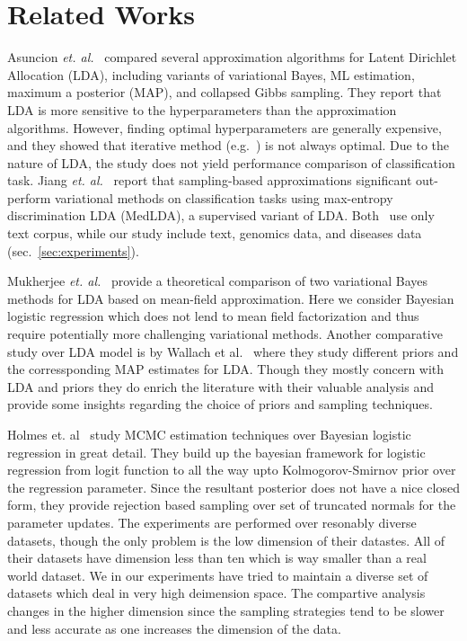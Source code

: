 \section{Related Works}

Asuncion {\it et. al.}~\cite{Asuncion2009smoothing} compared several
approximation algorithms for Latent Dirichlet Allocation (LDA), including
variants of variational Bayes, ML estimation, maximum a posterior (MAP), and
collapsed Gibbs sampling. They report that LDA is more sensitive to the
hyperparameters than the approximation algorithms. However, finding optimal
hyperparameters are generally expensive, and they showed that iterative method
(e.g.~\cite{Minka00}) is not always optimal. Due to the nature of LDA, the
study does not yield performance comparison of classification task. Jiang {\it
et. al.}~\cite{medlda_MCMC12} report that sampling-based approximations
significant out-perform variational methods on classification tasks using
max-entropy discrimination LDA (MedLDA), a supervised variant of LDA.
Both~\cite{Asuncion2009smoothing, medlda_MCMC12} use only text corpus, while
our study include text, genomics data, and diseases data (sec.~\ref{sec:experiments}). 

Mukherjee {\it et. al.}~\cite{Mukherjee08} provide a theoretical comparison of
two variational Bayes methods for LDA based on mean-field approximation. Here
we consider Bayesian logistic regression which does not lend to mean field
factorization and thus require potentially more challenging variational
methods. Another comparative study over LDA model is by Wallach et
al.~\cite{WallachMM09} where they study different priors and the
corressponding MAP estimates for LDA. Though they mostly concern with LDA and
priors they do enrich the literature with their valuable analysis and provide
some insights regarding the choice of priors and sampling techniques. 

Holmes et. al~\cite{Holmes} study MCMC estimation techniques over Bayesian logistic
regression in great detail. They build up the bayesian framework for logistic
regression from logit function to all the way upto Kolmogorov-Smirnov prior over
the regression parameter. Since the resultant posterior does not have a nice
closed form, they provide rejection based sampling over set of truncated
normals for the parameter updates. The experiments are performed over resonably
diverse datasets, though the only problem is the low dimension of their
datastes. All of their datasets have dimension less than ten which is way
smaller than a real world dataset. We in our experiments have tried to maintain
a diverse set of datasets which deal in very high deimension space. The
compartive analysis changes in the higher dimension since the sampling
strategies tend to be slower and less accurate as one increases the dimension of
the data. 

